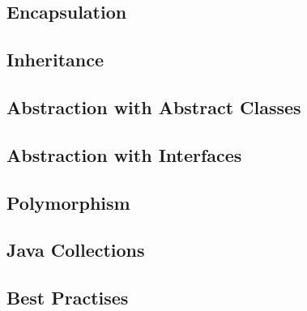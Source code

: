 \subsection{Encapsulation}

\subsection{Inheritance}

\subsection{Abstraction with Abstract Classes}

\subsection{Abstraction with Interfaces}

\subsection{Polymorphism}

\subsection{Java Collections}

\subsection{Best Practises}